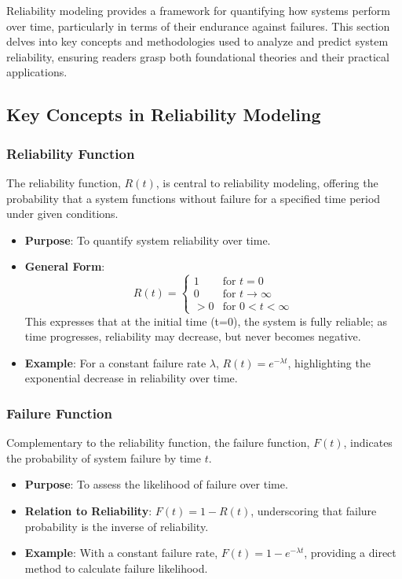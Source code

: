

Reliability modeling provides a framework for quantifying how systems perform over time, particularly in terms of their endurance against failures. This section delves into key concepts and methodologies used to analyze and predict system reliability, ensuring readers grasp both foundational theories and their practical applications.

\subsection*{Key Concepts in Reliability Modeling}

\subsubsection*{Reliability Function}
The reliability function, \( R(t) \), is central to reliability modeling, offering the probability that a system functions without failure for a specified time period under given conditions.
\begin{itemize}
    \item \textbf{Purpose}: To quantify system reliability over time.
    \item \textbf{General Form}:
        \begin{equation}
        R(t) = \begin{cases} 
        1 & \text{for } t = 0 \\
        0 & \text{for } t \rightarrow \infty \\
        > 0 & \text{for } 0 < t < \infty
        \end{cases}
        \end{equation}
    This expresses that at the initial time (t=0), the system is fully reliable; as time progresses, reliability may decrease, but never becomes negative.
    \item \textbf{Example}: For a constant failure rate \( \lambda \), \( R(t) = e^{-\lambda t} \), highlighting the exponential decrease in reliability over time.
\end{itemize}

\subsubsection*{Failure Function}
Complementary to the reliability function, the failure function, \( F(t) \), indicates the probability of system failure by time \( t \).
\begin{itemize}
    \item \textbf{Purpose}: To assess the likelihood of failure over time.
    \item \textbf{Relation to Reliability}: \( F(t) = 1 - R(t) \), underscoring that failure probability is the inverse of reliability.
    \item \textbf{Example}: With a constant failure rate, \( F(t) = 1 - e^{-\lambda t} \), providing a direct method to calculate failure likelihood.
\end{itemize}

